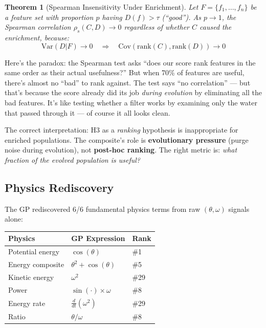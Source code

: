 \documentclass[11pt,a4paper]{article}
\newtheorem{theorem}{Theorem}
\begin{document}
\begin{theorem}[Spearman Insensitivity Under Enrichment]
Let $F = \{f_1, \ldots, f_n\}$ be a feature set with proportion $p$ having
$D(f) > \tau$ (``good''). As $p \to 1$, the Spearman correlation
$\rho_s(C, D) \to 0$ regardless of whether $C$ caused the enrichment,
because:
\[
\text{Var}(D|F) \to 0 \quad \Rightarrow \quad \text{Cov}(\text{rank}(C), \text{rank}(D)) \to 0
\]
\end{theorem}

\begin{plainbox}
Here's the paradox: the Spearman test asks ``does our score rank features in
the same order as their actual usefulness?'' But when 70\% of features are
useful, there's almost no ``bad'' to rank against. The test says ``no
correlation'' --- but that's because the score already did its job
\emph{during evolution} by eliminating all the bad features. It's like testing
whether a filter works by examining only the water that passed through it ---
of course it all looks clean.
\end{plainbox}

The correct interpretation: H3 as a \emph{ranking} hypothesis is inappropriate
for enriched populations. The composite's role is \textbf{evolutionary
pressure} (purge noise during evolution), not \textbf{post-hoc ranking}.
The right metric is: \emph{what fraction of the evolved population is useful?}

\subsection{Physics Rediscovery}

The GP rediscovered 6/6 fundamental physics terms from raw $(\theta, \omega)$
signals alone:

\begin{center}
\begin{tabular}{lll}
\toprule
\textbf{Physics} & \textbf{GP Expression} & \textbf{Rank} \\
\midrule
Potential energy & $\cos(\theta)$ & \#1 \\
Energy composite & $\theta^2 + \cos(\theta)$ & \#5 \\
Kinetic energy & $\omega^2$ & \#29 \\
Power & $\sin(\cdot) \times \omega$ & \#8 \\
Energy rate & $\frac{d}{dt}(\omega^2)$ & \#29 \\
Ratio & $\theta / \omega$ & \#8 \\
\bottomrule
\end{tabular}
\end{center}
\end{document}
